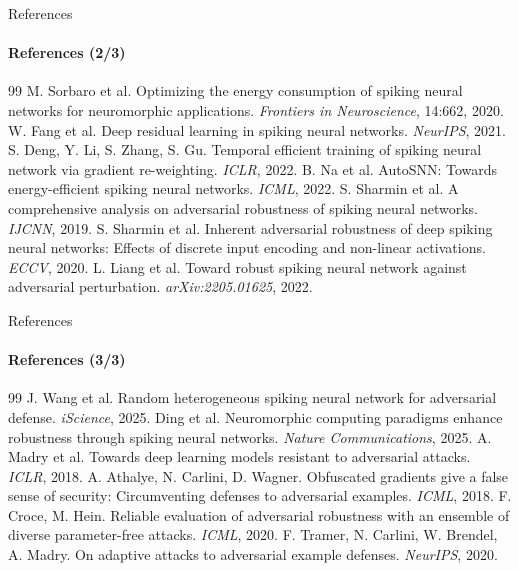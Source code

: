 \documentclass[aspectratio=169,11pt]{beamer}
\begin{document}
\begin{frame}{References}
\framesubtitle{References (2/3)}
\small
\setlength{\itemsep}{2pt}
\begin{thebibliography}{99}
M. Sorbaro et al.
Optimizing the energy consumption of spiking neural networks for
neuromorphic applications.
\emph{Frontiers in Neuroscience}, 14:662, 2020.
W. Fang et al.
Deep residual learning in spiking neural networks.
\emph{NeurIPS}, 2021.
S. Deng, Y. Li, S. Zhang, S. Gu.
Temporal efficient training of spiking neural network via gradient
re-weighting.
\emph{ICLR}, 2022.
B. Na et al.
AutoSNN: Towards energy-efficient spiking neural networks.
\emph{ICML}, 2022.
S. Sharmin et al.
A comprehensive analysis on adversarial robustness of spiking neural
networks.
\emph{IJCNN}, 2019.
S. Sharmin et al.
Inherent adversarial robustness of deep spiking neural networks:
Effects of discrete input encoding and non-linear activations.
\emph{ECCV}, 2020.
L. Liang et al.
Toward robust spiking neural network against adversarial perturbation.
\emph{arXiv:2205.01625}, 2022.
\end{thebibliography}
\end{frame}

\begin{frame}{References}
\framesubtitle{References (3/3)}
\small
\setlength{\itemsep}{2pt}
\begin{thebibliography}{99}
J. Wang et al.
Random heterogeneous spiking neural network for adversarial defense.
\emph{iScience}, 2025.
Ding et al.
Neuromorphic computing paradigms enhance robustness through spiking
neural networks.
\emph{Nature Communications}, 2025.
A. Madry et al.
Towards deep learning models resistant to adversarial attacks.
\emph{ICLR}, 2018.
A. Athalye, N. Carlini, D. Wagner.
Obfuscated gradients give a false sense of security:
Circumventing defenses to adversarial examples.
\emph{ICML}, 2018.
F. Croce, M. Hein.
Reliable evaluation of adversarial robustness with an ensemble of
diverse parameter-free attacks.
\emph{ICML}, 2020.
F. Tramer, N. Carlini, W. Brendel, A. Madry.
On adaptive attacks to adversarial example defenses.
\emph{NeurIPS}, 2020.
\end{thebibliography}
\end{frame}

\appendix
\end{document}
